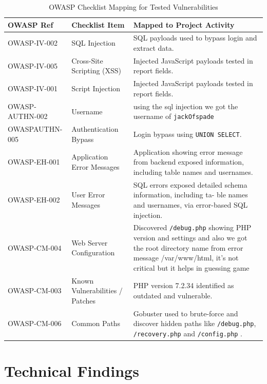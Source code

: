 \documentclass[12pt]{article}
\begin{document}
\begin{table}[h!]
\centering
\begin{tabular}{|p{3cm}|p{5cm}|p{6cm}|}
\hline
\textbf{OWASP Ref} & \textbf{Checklist Item} & \textbf{Mapped to Project Activity} \\
\hline
OWASP-IV-002 & SQL Injection & SQL payloads used to bypass login and extract data. \\
\hline
OWASP-IV-005 & Cross-Site Scripting (XSS) & Injected JavaScript payloads tested in report fields. \\
\hline
\hline
OWASP-IV-001 &  Script Injection & Injected JavaScript payloads
tested in report fields. \\
\hline
OWASP-AUTHN-002 & Username & using the sql injection we got the username of \texttt{jackOfspade} \\
\hline
\hline
OWASPAUTHN-005 & Authentication Bypass & Login bypass using \verb|UNION SELECT|. \\
\hline
OWASP-EH-001 & Application Error Messages &  Application showing error message from backend exposed information, including table names and usernames. \\ 
\hline
\hline
OWASP-EH-002 & User Error Messages & SQL errors exposed detailed
schema information, including ta-
ble names and usernames, via
error-based SQL injection.\\
\hline
OWASP-CM-004 & Web Server Configuration & Discovered \texttt{/debug.php} showing PHP version and settings and also we got the root directory name from error message /var/www/html, it's not critical but it helps in guessing game \\
\hline
OWASP-CM-003 & Known Vulnerabilities / Patches & PHP version 7.2.34 identified as outdated and vulnerable. \\
\hline
OWASP-CM-006 & Common Paths & Gobuster used to brute-force and discover hidden paths like \texttt{/debug.php},  \texttt{/recovery.php} and \texttt{/config.php} . \\
\hline
\end{tabular}
\caption{OWASP Checklist Mapping for Tested Vulnerabilities}
\end{table}


\FloatBarrier


\section{Technical Findings}
\end{document}
